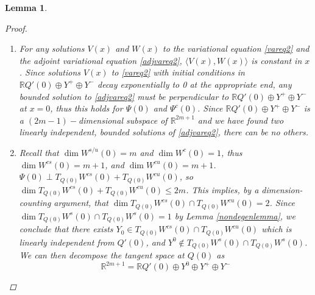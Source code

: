 \documentclass[12pt]{article}
\def\R{{\mathbb R}}
\newtheorem{lemma}{Lemma}
\begin{document}
\begin{lemma}
\begin{proof}
\begin{enumerate}
\[
\Psi^c(x) = \begin{pmatrix}
-c_0 + g_1(x) \\ g_2(x) \\
-c_2 + g_3(x) \\ g_4(x) \\
\vdots \\
-c_{2m-2} + g_{2m-1}(x) \\ g_{2m}(x) \\ 1
\end{pmatrix}
\]

where the functions $g_j(x)$ are linear combinations of the functions $f_j(x)$ from \eqref{DefA} and their derivatives and are thus exponentially localized. It follows that $\Psi^c(x) \rightarrow W_0$ as $|x| \rightarrow \infty$, where $W_0$ is given by \eqref{W0}.

\item For any solutions $V(x)$ and $W(x)$ to the variational equation \eqref{vareq2} and the adjoint variational equation \eqref{adjvareq2}, $\langle V(x), W(x) \rangle$ is constant in $x$. Since solutions $V(x)$ to \eqref{vareq2} with initial conditions in $\R Q'(0) \oplus Y^+ \oplus Y^-$ decay exponentially to 0 at the appropriate end, any bounded solution to \eqref{adjvareq2} must be perpendicular to $\R Q'(0) \oplus Y^+ \oplus Y^-$ at $x = 0$, thus this holds for $\Psi(0)$ and $\Psi^c(0)$. Since $\R Q'(0) \oplus Y^+ \oplus Y^-$ is a $(2m-1)-$dimensional subspace of $\R^{2m+1}$ and we have found two linearly independent, bounded solutions of \eqref{adjvareq2}, there can be no others.

\item Recall that $\dim W^{s/u}(0) = m$ and $\dim W^c(0) = 1$, thus $\dim W^{cs}(0) = m + 1$, and $\dim W^{cu}(0) = m + 1$. $\Psi(0) \perp T_{Q(0)}W^{cs}(0) + T_{Q(0)}W^{cu}(0)$, so $\dim T_{Q(0)}W^{cs}(0) + T_{Q(0)}W^{cu}(0) \leq 2m$. This implies, by a dimension-counting argument, that $\dim T_{Q(0)}W^{cs}(0) \cap T_{Q(0)}W^{cu}(0) = 2$. Since $\dim T_{Q(0)}W^s(0) \cap T_{Q(0)}W^s(0) = 1$ by Lemma \ref{nondegenlemma}, we conclude that there exists $Y_0 \in T_{Q(0)}W^{cs}(0) \cap T_{Q(0)}W^{cu}(0)$ which is linearly independent from $Q'(0)$, and $Y^0 \notin T_{Q(0)}W^s(0) \cap T_{Q(0)}W^s(0)$. We can then decompose the tangent space at $Q(0)$ as 
\[
\R^{2m + 1} = \R Q'(0) \oplus Y^0 \oplus Y^+ \oplus Y^-
\]



\end{enumerate}
\end{proof}
\end{lemma}
\end{document}
